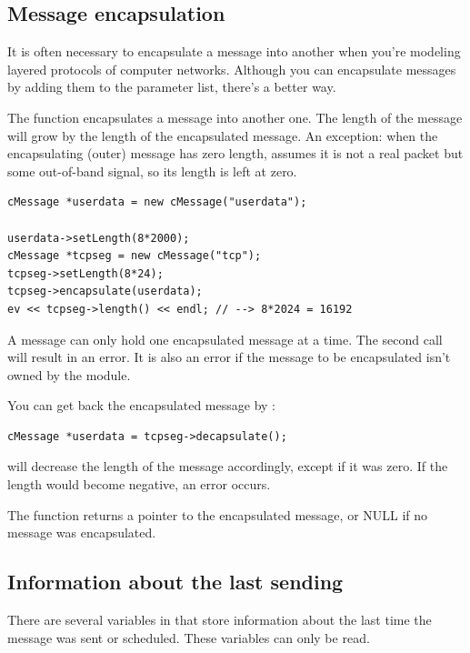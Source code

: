 \subsection{Message encapsulation}

It is often necessary to encapsulate a
message into another when you're modeling
layered protocols of computer networks. Although you can encapsulate
messages by adding them to the parameter list, there's a better way.


The  function encapsulates a message
into another one. The length of the message will grow by the length of
the encapsulated message. An exception: when the encapsulating (outer)
message has zero length, {\opp} assumes it is not a real packet but
some out-of-band signal, so its length is left at zero.

\begin{verbatim}
cMessage *userdata = new cMessage("userdata");

userdata->setLength(8*2000);
cMessage *tcpseg = new cMessage("tcp");
tcpseg->setLength(8*24);
tcpseg->encapsulate(userdata);
ev << tcpseg->length() << endl; // --> 8*2024 = 16192
\end{verbatim}


A message can only hold one encapsulated message at a time. The
second  call will result in an error. It is also
an error if the message to be encapsulated isn't owned by the
module.

You can get back the encapsulated message by :

\begin{verbatim}
cMessage *userdata = tcpseg->decapsulate();
\end{verbatim}

 will decrease the length of the message accordingly,
except if it was zero. If the length would become negative, an
error occurs.


The  function returns a pointer to the encapsulated
message, or NULL if no message was encapsulated.





\subsection{Information about the last sending}

There are several variables in  that store
information about the last time the message was sent or
scheduled. These variables can only be read.

